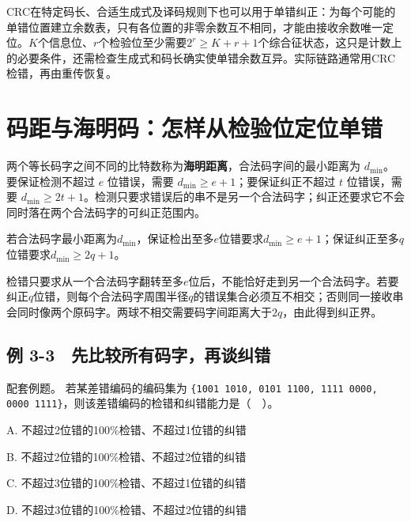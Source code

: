 CRC在特定码长、合适生成式及译码规则下也可以用于单错纠正：为每个可能的单错位置建立余数表，只有各位置的非零余数互不相同，才能由接收余数唯一定位。\(K\)个信息位、\(r\)个检验位至少需要\(2^r\ge K+r+1\)个综合征状态，这只是计数上的必要条件，还需检查生成式和码长确实使单错余数互异。实际链路通常用CRC检错，再由重传恢复。

\section{码距与海明码：怎样从检验位定位单错}\label{CN03-04}

两个等长码字之间不同的比特数称为\textbf{海明距离}，合法码字间的最小距离为 \(d_{\min}\)。要保证检测不超过 \(e\) 位错误，需要 \(d_{\min}\ge e+1\)；要保证纠正不超过 \(t\) 位错误，需要 \(d_{\min}\ge2t+1\)。检测只要求错误后的串不是另一个合法码字；纠正还要求它不会同时落在两个合法码字的可纠正范围内。

\begin{theorem}[最小码距的检测与纠正界]

若合法码字最小距离为\(d_{\min}\)，保证检出至多\(e\)位错要求\(d_{\min}\ge e+1\)；保证纠正至多\(q\)位错要求\(d_{\min}\ge2q+1\)。

\end{theorem}

检错只要求从一个合法码字翻转至多\(e\)位后，不能恰好走到另一个合法码字。若要纠正\(q\)位错，则每个合法码字周围半径\(q\)的错误集合必须互不相交；否则同一接收串会同时像两个原码字。两球不相交需要码字间距离大于\(2q\)，由此得到纠正界。

\subsection{例 3-3　先比较所有码字，再谈纠错}\label{CN03-ex3}

{\begin{example}[配套例题]

配套例题。 若某差错编码的编码集为 \texttt{\{1001 1010,\allowbreak{} 0101 1100,\allowbreak{} 1111 0000,\allowbreak{} 0000 1111\}}，则该差错编码的检错和纠错能力是（　）。

A. 不超过2位错的100\%检错、不超过1位错的纠错

B. 不超过2位错的100\%检错、不超过2位错的纠错

C. 不超过3位错的100\%检错、不超过1位错的纠错

D. 不超过3位错的100\%检错、不超过2位错的纠错

\end{example}}

